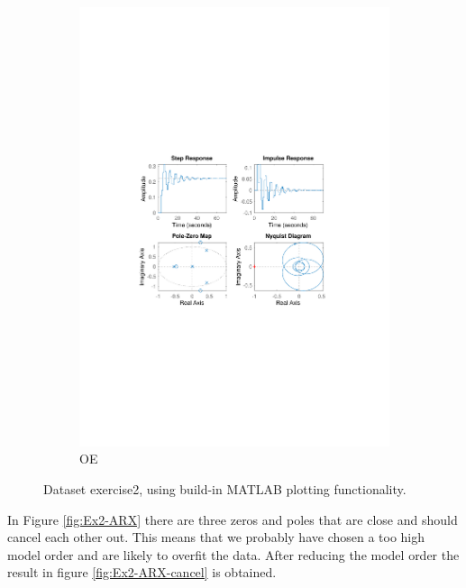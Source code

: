 \documentclass[]{article}
\begin{document}
\begin{figure}[ht]
\begin{subfigure}{.49\textwidth}
	\includegraphics[trim= 10cm 8cm 10cm 8cm, scale=0.4]{figures/3-OE-Ex2.pdf}
	\caption{OE}
	\label{fig:Ex2-OE}
\end{subfigure}
\caption{Dataset exercise2, using build-in MATLAB plotting functionality.}
\label{fig:Ex2}
\end{figure}

In Figure \ref{fig:Ex2-ARX} there are three zeros and poles that are close and should cancel each other out. This means that we probably have chosen a too high model order and are likely to overfit the data. After reducing the model order the result in figure \ref{fig:Ex2-ARX-cancel} is obtained.
\end{document}

